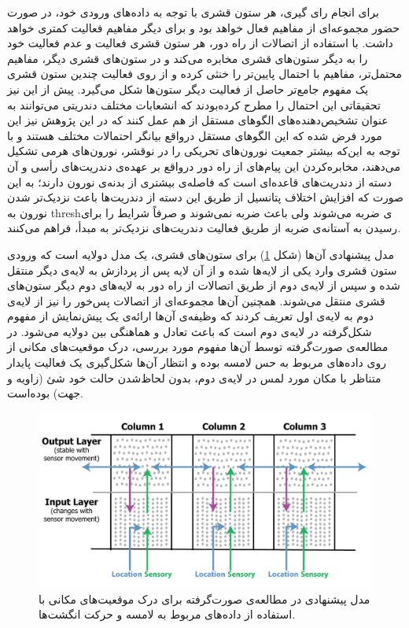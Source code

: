 \documentclass[12pt]{report}
\begin{document}
	برای انجام رای گیری، هر ستون قشری با توجه به داده‌های ورودی خود، در صورت حضور مجموعه‌ای از مفاهیم فعال خواهد بود و برای دیگر مفاهیم فعالیت کمتری خواهد داشت. با استفاده از اتصالات از راه دور، هر ستون قشری فعالیت و عدم فعالیت خود را به دیگر ستون‌های قشری مخابره می‌کند و در ستون‌های قشری دیگر، مفاهیم محتمل‌تر، مفاهیم با احتمال پایین‌تر را خنثی کرده و  از روی فعالیت چندین ستون قشری یک مفهوم جامع‌تر حاصل از فعالیت دیگر ستون‌ها شکل می‌گیرد. پیش از این نیز تحقیقاتی این احتمال را مطرح کرده‌بودند که انشعابات مختلف دندریتی می‌توانند به عنوان تشخیص‌دهنده‌های الگو‌های مستقل از هم عمل کنند \cite{POIRAZI2003989, Polsky2004} که در این پژوهش نیز این مورد فرض شده که این الگو‌های مستقل در‌واقع بیانگر احتمالات مختلف هستند و با توجه به این‌که بیشتر جمعیت نورون‌های تحریکی را در نوقشر، نورون‌های هرمی تشکیل می‌دهند، مخابره‌کردن این پیام‌های از راه دور درواقع بر عهده‌ی دندریت‌های رأسی و آن دسته از دندریت‌های قاعده‌ای‌ است که فاصله‌ی بیشتری از بدنه‌ی نورون دارند؛ به این صورت که افزایش اختلاف پتانسیل از طریق این دسته‌ از دندریت‌ها باعث نزدیک‌تر شدن نورون به \gls{thresh}‌ی ضربه می‌شوند ولی باعث ضربه نمی‌شوند و صرفاً شرایط را برای رسیدن به آستانه‌ی ضربه از طریق فعالیت دندریت‌های نزدیک‌تر به مبدأ، فراهم می‌کنند.
	
	مدل پیشنهادی آن‌ها (شکل \ref{fig:hawkins2017}) برای ستون‌های قشری، یک مدل دو‌لایه‌ است که ورودی ستون قشری وارد یکی از لایه‌ها شده و از آن لایه پس از پردازش به لایه‌ی دیگر منتقل شده و سپس از لایه‌‌ی دوم از طریق اتصالات از راه دور به لا‌‌یه‌های دوم دیگر ستون‌های قشری منتقل می‌شوند. همچنین آن‌ها مجموعه‌ای از اتصالات پس‌خور را نیز از لایه‌ی دوم به لا‌یه‌ی اول تعریف کردند که وظیفه‌ی آن‌ها ارائه‌ی یک پیش‌نمایش از مفهوم‌ شکل‌گرفته در لايه‌ی دوم است که باعث تعادل و هماهنگی بین دو‌لایه‌ می‌شود. در مطالعه‌ی صورت‌گرفته توسط آن‌ها\cite{Hawkins2017} مفهوم مورد بررسی، درک موقعیت‌های مکانی از روی داده‌های مربوط به حس لامسه بوده‌ و انتظار آن‌ها شکل‌گیری یک فعالیت پایدار متناظر با مکان مورد لمس در لایه‌ی دوم، بدون لحاظ‌شدن حالت خود شئ (زاویه و جهت) بوده‌است. 
	
	\begin{figure}[]
		\centering
		\includegraphics[width=1.0\linewidth]{hawkins2017.jpg}
		\caption[NS]{
			مدل پیشنهادی در مطالعه‌ی صورت‌گرفته \cite{Hawkins2017} برای درک موقعیت‌های مکانی با استفاده از داده‌های مربوط به لامسه و حرکت انگشت‌ها.
		}
		\label{fig:hawkins2017} 
	\end{figure}
\end{document}
